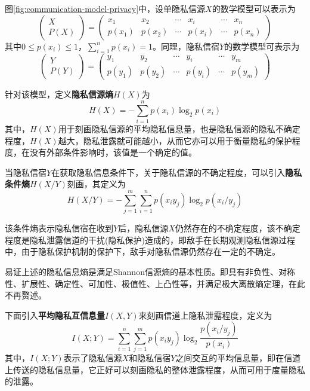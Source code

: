 图\ref{fig:communication-model-privacy}中，设单隐私信源$X$的数学模型可以表示为
\begin{equation}
\begin{pmatrix}
X\\ 
P(X)
\end{pmatrix}=\begin{pmatrix}
x_{1} & x_{2} & \cdots  & x_{i} & \cdots  & x_{n}\\ 
p(x_{1})& p(x_{2}) & \cdots & p(x_{i}) & \cdots & p(x_{n})
\end{pmatrix}
\end{equation}
其中$0\leqslant p(x_{i})\leqslant1$，$\sum_{i=1}^{n}p(x_{i})=1$。同理，隐私信宿$Y$的数学模型可表示为
\begin{equation}
\label{eq:single-information-source}
\begin{pmatrix}
Y\\ 
P(Y)
\end{pmatrix}=\begin{pmatrix}
y_{1} & y_{2} & \cdots  & y_{i} & \cdots  & y_{m}\\ 
p(y_{1})& p(y_{2}) & \cdots & p(y_{i}) & \cdots & p(y_{m})
\end{pmatrix}
\end{equation}

针对该模型，定义\textbf{隐私信源熵}$H(X)$为
\begin{equation}
H(X)=-\sum_{i=1}^{n}p(x_{i})\log_{2}p(x_{i})
\end{equation}
其中，$H(X)$用于刻画隐私信源的平均隐私信息量，也是隐私信源的隐私不确定程度，$H(X)$越大，隐私泄露就可能越小，从而它亦可以用于衡量隐私的保护程度，在没有外部条件影响时，该值是一个确定的值。

当隐私信宿$Y$在获取隐私信息条件下，关于隐私信源的不确定程度，可以引入\textbf{隐私条件熵}$H(X/Y)$刻画，其定义为
\begin{equation}
H(X/Y)=-\sum_{j=1}^{m}\sum_{i=1}^{n}p(x_{i}y_{j})\log_{2}p(x_{i}/y_{j})
\end{equation}

该条件熵表示隐私信宿在收到$Y$后，隐私信源$X$仍然存在的不确定程度，该不确定程度是隐私泄露信道的干扰(隐私保护)造成的，即敌手在长期观测隐私信源过程中，由于隐私保护机制的保护下，敌手对隐私信源仍然存在一定的不确定。

易证上述的隐私信息熵是满足Shannon信源熵的基本性质。即具有非负性、对称性、扩展性、确定性、可加性、极值性、上凸性等，并满足极大离散熵定理，在此不再赘述。

下面引入\textbf{平均隐私互信息量}$I(X,Y)$来刻画信道上隐私泄露程度，定义为
\begin{equation}
I(X;Y)=\sum_{i=1}^{n}\sum_{j=1}^{m}p(x_{i}y_{j})\log_{2}\frac{p(x_{i}/y_{j})}{p(x_{i})}
\end{equation}
其中，$I(X;Y)$表示了隐私信源$X$和隐私信宿$Y$之间交互的平均信息量，即在信道上传送的隐私信息量，它正好可以刻画隐私的整体泄露程度，从而可用于度量隐私的泄露。

